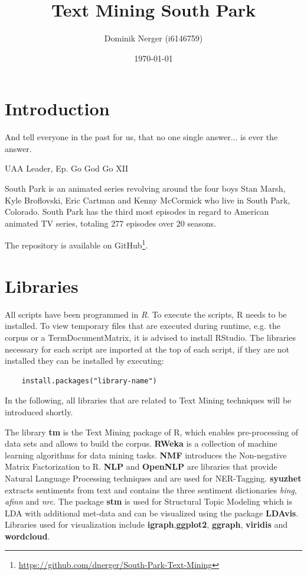 \documentclass[10pt,a4paper]{article}
\author{Dominik Nerger (i6146759)}
\title{Text Mining South Park}
\date{\today}
\begin{document}
	\maketitle
	
	\tableofcontents
	\newpage
	\section{Introduction}
	\epigraph{ And tell everyone in the past for us, that no one single answer... is ever the answer. }{UAA Leader, Ep. Go God Go XII}

	South Park is an animated series revolving around the four boys Stan Marsh, Kyle Broflovski, Eric Cartman and Kenny McCormick who live in South Park, Colorado. South Park has the third most episodes in regard to American animated TV series, totaling 277 episodes over 20 seasons.
	
	
	The repository is available on GitHub\footnote{\url{https://github.com/dnerger/South-Park-Text-Mining}}.
	\section{Libraries}
	
	All scripts have been programmed in \textit{R}. To execute the scripts, R needs to be installed. To view temporary files that are executed during runtime, e.g. the corpus or a TermDocumentMatrix, it is advised to install RStudio. The libraries necessary for each script are imported at the top of each script, if they are not installed they can be installed by executing:
	
	\begin{verbatim}
	install.packages("library-name")
	\end{verbatim}
	
	In the following, all libraries that are related to Text Mining techniques will be introduced shortly.
	
	The library \textbf{tm} is the Text Mining package of R, which enables pre-processing of data sets and allows to build the corpus. \textbf{RWeka} is a collection of machine learning algorithms for data mining tasks. \textbf{NMF} introduces the Non-negative Matrix Factorization to R.
	\textbf{NLP} and \textbf{OpenNLP} are libraries that provide Natural Language Processing techniques and are used for NER-Tagging. \textbf{syuzhet} extracts sentiments from text and contains the three sentiment dictionaries \textit{bing}, \textit{afinn} and \textit{nrc}.
	The package \textbf{stm} is used for Structural Topic Modeling  which is LDA with additional met-data and can be visualized using the package \textbf{LDAvis}.
	Libraries used for visualization include \textbf{igraph},\textbf{ggplot2}, \textbf{ggraph}, \textbf{viridis} and \textbf{wordcloud}.
	
\end{document}
